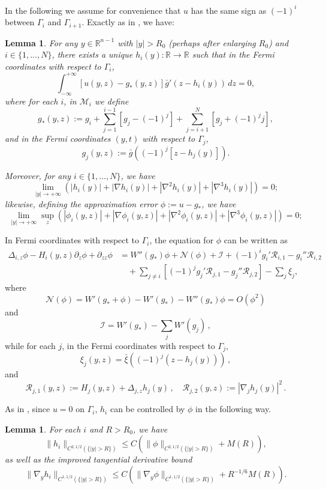 \documentclass{article}
\newcommand{\R}{\mathbb{R}}
\newtheorem{lemma}[theorem]{Lemma}
\theoremstyle{definition}
\begin{document}
In the following we assume for convenience that $u$ has the same sign as $(-1)^i$ between $\Gamma_i$ and $\Gamma_{i+1}$. Exactly as in \cite[Lemma 4.3]{GuiWangWei2020}, we have:
\begin{lemma}
\label{lem:914gotb2jk}
For any $y\in\R^{n-1}$ with $|y| > R_0$ (perhaps after enlarging $R_0$) and $i\in\{1,...,N\}$, there exists a unique $h_i(y):\R\to\R$ such that in the Fermi coordinates with respect to $\Gamma_i$,
$$
\int_{-\infty}^{+\infty} [u(y, z) - g_*(y, z)] \bar{g}'(z - h_i(y)) \, dz = 0,
$$
where for each $i$, in $\mathcal{M}_i$ we define
$$
g_*(y, z) := g_i + \sum_{j=1}^{i-1} \left[g_j - (-1)^j \right] + \sum_{j=i+1}^N \left[g_j + (-1)^jj \right],
$$
and in the Fermi coordinates $(y, t)$ with respect to $\Gamma_j$,
$$
g_j(y, z) := \bar{g}((-1)^j [z - h_j(y)]).
$$

Moreover, for any $i\in\{1,...,N\}$, we have
$$
\lim_{|y| \to +\infty} \left( |h_i(y)| + |\nabla h_i(y)| + |\nabla^2 h_i(y)| + |\nabla^3 h_i(y)| \right) = 0;
$$
likewise, defining the \textit{approximation error} $\phi := u - g_*$, we have
$$
\lim_{|y| \to +\infty} \sup_{z}\left(|\phi_i(y,z)|+|\nabla \phi_i(y,z)|+|\nabla^2 \phi_i(y,z)|+|\nabla^3 \phi_i(y,z)|\right) = 0;
$$
\end{lemma}
In Fermi coordinates with respect to $\Gamma_i$, the equation for $\phi$ can be written as
\begin{equation*}
\begin{aligned}
\Delta_{i,z}\phi- H_i(y,z)\partial_z\phi + \partial_{zz}\phi &= W''(g_*)\phi+\mathcal{N}(\phi)+ \mathcal{I}+ (-1)^i g_i' \mathcal{R}_{i,1}- g_i'' \mathcal{R}_{i,2} \\
&\quad+\sum_{j \neq i} [(-1)^j g_j'\mathcal{R}_{j,1}-g_j'' \mathcal{R}_{j,2}]-\sum_j \xi_j,
\end{aligned}
\end{equation*}
where
$$
\mathcal{N}(\phi)=W'(g_* + \phi)-W'(g_*)-W''(g_*)\phi=O(\phi^2)
$$
and
$$
\mathcal{I}=W'(g_*)-\sum_j W'(g_j)\,,
$$
while for each $j$, in the Fermi coordinates with respect to $\Gamma_j$,
$$
\xi_j(y, z) = \bar{\xi}((-1)^j(z - h_j(y)))\,,
$$
and
$$
\mathcal{R}_{j,1}(y, z):=H_j(y, z) + \Delta_{j,z} h_j(y)\,, \quad 
\mathcal{R}_{j,2}(y, z):=|\nabla_j h_j(y)|^2\,.
$$

As in \cite[Lemma 4.6]{WW19}, since $u = 0$ on $\Gamma_i$, $h_i$ can be controlled by $\phi$ in the following way.

\begin{lemma}\label{lem:72gioubo}
For each $i$ and $R > R_0$, we have
\begin{equation*}
\|h_i\|_{C^{2,1/2}(\{|y|>R\})} \leq C \left(\|\phi\|_{C^{2,1/2}(\{|y|>R\})} + M(R)\right),
\end{equation*}
as well as the improved tangential derivative bound
\begin{equation*}
\|\nabla_{y} h_i\|_{C^{1,1/2}(\{|y|>R\})} \leq C\left( \|\nabla_{y}\phi\|_{C^{1,1/2}(\{|y|>R\})} + R^{-1/6} M(R)\right).
\end{equation*}
\end{lemma}
\end{document}
